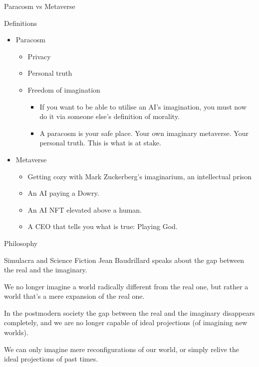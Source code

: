 \documentclass[presentation]{beamer}
\begin{document}
\begin{frame}[label={sec:orga558cba}]{Paracosm vs Metaverse}
\begin{block}{Definitions}
\begin{itemize}
\item Paracosm
\begin{itemize}
\item Privacy
\item Personal truth
\item Freedom of imagination
\begin{itemize}
\item If you want to be able to utilise an
AI's imagination, you must now do it via
someone else's definition of morality.
\item A paracosm is your safe place. Your own
imaginary metaverse. Your personal truth.
This is what is at stake.
\end{itemize}
\end{itemize}
\item Metaverse
\begin{itemize}
\item Getting cozy with Mark Zuckerberg's imaginarium, an intellectual prison
\item An AI paying a Dowry.
\item An AI NFT elevated above a human.
\item A CEO that tells you what is true: Playing God.
\end{itemize}
\end{itemize}
\end{block}
\end{frame}

\begin{frame}[label={sec:orgc3b857a}]{Philosophy}
\begin{block}{Simulacra and Science Fiction}
Jean Baudrillard speaks about the gap
between the real and the imaginary.

We no longer imagine a world radically
different from the real one, but
rather a world that's a mere expansion
of the real one.

In the postmodern society the gap
between the real and the imaginary
disappears completely, and we are no
longer capable of ideal projections
(of imagining new worlds).

We can only imagine mere
reconfigurations of our world, or
simply relive the ideal projections of
past times.
\end{block}
\end{frame}
\end{document}
